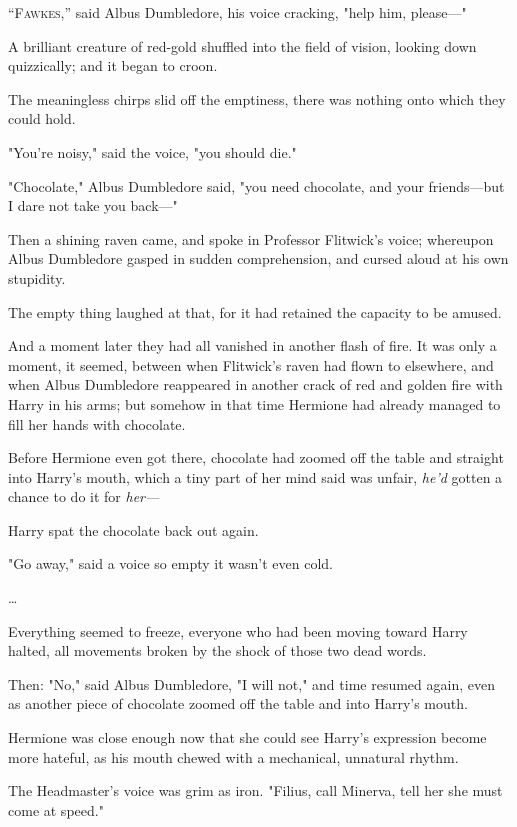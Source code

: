 
\lettrine{“F}{awkes},'' said 
Albus Dumbledore, his voice cracking, "help him, please---"

A brilliant creature of red-gold shuffled into the field of vision, looking 
down quizzically; and it began to croon.

The meaningless chirps slid off the emptiness, there was nothing onto which 
they could hold.

"You're noisy," said the voice, "you should die."

"Chocolate," Albus Dumbledore said, "you need chocolate, and your friends---but 
I dare not take you back---"

Then a shining raven came, and spoke in Professor Flitwick's voice; whereupon 
Albus Dumbledore gasped in sudden comprehension, and cursed aloud at his own 
stupidity.

The empty thing laughed at that, for it had retained the capacity to be amused.

And a moment later they had all vanished in another flash of fire.
\sbreak
It was only a moment, it seemed, between when Flitwick's raven had flown to 
elsewhere, and when Albus Dumbledore reappeared in another crack of red and 
golden fire with Harry in his arms; but somehow in that time Hermione had 
already managed to fill her hands with chocolate.

Before Hermione even got there, chocolate had zoomed off the table and straight 
into Harry's mouth, which a tiny part of her mind said was unfair, \emph{he'd} 
gotten a chance to do it for \emph{her---}

Harry spat the chocolate back out again.

"Go away," said a voice so empty it wasn't even cold.

{\ldots}

Everything seemed to freeze, everyone who had been moving toward Harry halted, 
all movements broken by the shock of those two dead words.

Then: "No," said Albus Dumbledore, "I will not," and time resumed again, even 
as another piece of chocolate zoomed off the table and into Harry's mouth.

Hermione was close enough now that she could see Harry's expression become more 
hateful, as his mouth chewed with a mechanical, unnatural rhythm.

The Headmaster's voice was grim as iron. "Filius, call Minerva, tell her she 
must come at speed."


